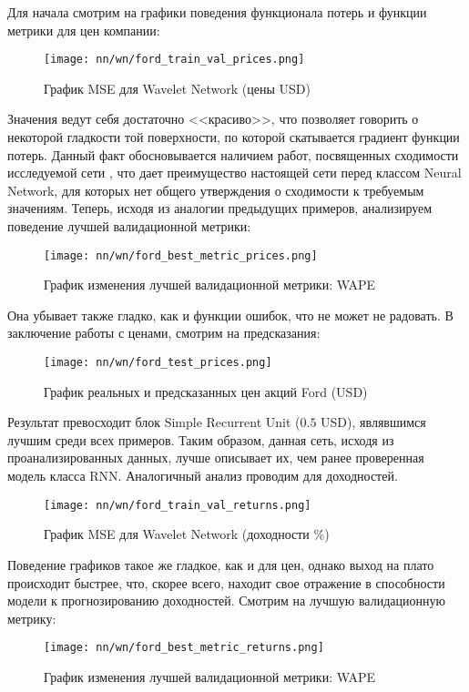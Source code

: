 Для начала смотрим на графики поведения функционала потерь и функции метрики для цен компании:
\begin{figure}[H]
	\centering
	\texttt{[image: nn/wn/ford\_train\_val\_prices.png]}
	\caption{График MSE для Wavelet Network (цены USD)}
	\label{fig::wn_ford_train_val_prices}
\end{figure}
\noindent Значения ведут себя достаточно <<красиво>>, что позволяет говорить о некоторой гладкости той поверхности, по которой скатывается градиент функции потерь. Данный факт обосновывается наличием работ, посвященных сходимости исследуемой сети \cite{alexandridis2014wavelet, zhang1992wavelet}, что дает преимущество настоящей сети перед классом Neural Network, для которых нет общего утверждения о сходимости к требуемым значениям. Теперь, исходя из аналогии предыдущих примеров, анализируем поведение лучшей валидационной метрики:
\begin{figure}[H]
	\centering
	\texttt{[image: nn/wn/ford\_best\_metric\_prices.png]}
	\caption{График изменения лучшей валидационной метрики: WAPE}
	\label{fig::wn_ford_best_metric_prices}
\end{figure}
\noindent Она убывает также гладко, как и функции ошибок, что не может не радовать. В заключение работы с ценами, смотрим на предсказания:
\begin{figure}[H]
	\centering
	\texttt{[image: nn/wn/ford\_test\_prices.png]}
	\caption{График реальных и предсказанных цен акций Ford (USD)}
	\label{fig::wn_ford_test_prices}
\end{figure}
\noindent Результат превосходит блок Simple Recurrent Unit ($0.5$ USD), являвшимся лучшим среди всех примеров. Таким образом, данная сеть, исходя из проанализированных данных, лучше описывает их, чем ранее проверенная модель класса RNN. Аналогичный анализ проводим для доходностей.
\begin{figure}[H]
	\centering
	\texttt{[image: nn/wn/ford\_train\_val\_returns.png]}
	\caption{График MSE для Wavelet Network (доходности \%)}
	\label{fig::wn_ford_train_val_returns}
\end{figure}
\noindent Поведение графиков такое же гладкое, как и для цен, однако выход на плато происходит быстрее, что, скорее всего, находит свое отражение в способности модели к прогнозированию доходностей. Смотрим на лучшую валидационную метрику:
\begin{figure}[H]
	\centering
	\texttt{[image: nn/wn/ford\_best\_metric\_returns.png]}
	\caption{График изменения лучшей валидационной метрики: WAPE}
	\label{fig::wn_ford_best_metric_returns}
\end{figure}
